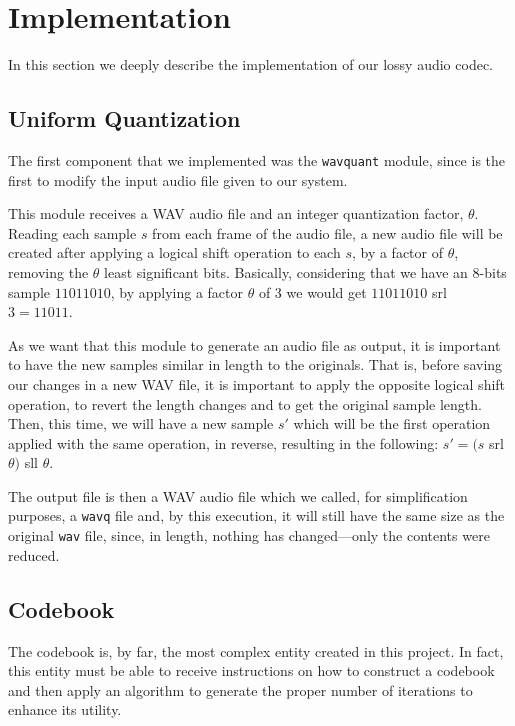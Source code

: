 \documentclass[conference]{IEEEtran}
\begin{document}
\section{Implementation}

In this section we deeply describe the implementation of our lossy audio codec.

\subsection{Uniform Quantization}

The first component that we implemented was the \texttt{wavquant} module, since is the first to modify the input audio file given to our system. 

This module receives a \ac{WAV} audio file and an integer quantization factor, $\theta$. Reading each sample $s$ from each frame of the audio file, a new audio file will be created after applying a logical shift operation to each $s$, by a factor of $\theta$, removing the $\theta$ least significant bits. Basically, considering that we have an 8-bits sample $11011010$, by applying a factor $\theta$ of 3 we would get $11011010$ srl $3 = 11011$.

As we want that this module to generate an audio file as output, it is important to have the new samples similar in length to the originals. That is, before saving our changes in a new \ac{WAV} file, it is important to apply the opposite logical shift operation, to revert the length changes and to get the original sample length. Then, this time, we will have a new sample $s'$ which will be the first operation applied with the same operation, in reverse, resulting in the following: $s'=(s$ srl $\theta)$ sll $\theta$.

The output file is then a \ac{WAV} audio file which we called, for simplification purposes, a \texttt{wavq} file and, by this execution, it will still have the same size as the original \texttt{wav} file, since, in length, nothing has changed—only the contents were reduced.

\subsection{Codebook}

The codebook is, by far, the most complex entity created in this project. In fact, this entity must be able to receive instructions on how to construct a codebook and then apply an algorithm to generate the proper number of iterations to enhance its utility.
\end{document}
